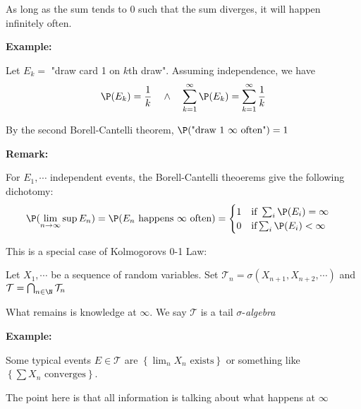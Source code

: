 \par\bigskip
\noindent As long as the sum tends to 0 such that the sum diverges, it will happen infinitely often.
\par\bigskip
\noindent\textbf{Example:}\par
\noindent Let $E_k = $ "draw card 1 on $k$th draw". Assuming independence, we have
\begin{equation*}
  \begin{gathered}
    \P(E_k) = \dfrac{1}{k} \quad\wedge\quad \sum_{k=1}^{\infty}\P(E_k) = \sum_{k=1}^{\infty}\dfrac{1}{k}
  \end{gathered}
\end{equation*}\par
\noindent By the second Borell-Cantelli theorem, $\P(\text{"draw 1 $\infty$ often"}) = 1$
\par\bigskip
\noindent\textbf{Remark:}\par
\noindent For $E_1,\cdots$ independent events, the Borell-Cantelli theoerems give the following dichotomy:
\begin{equation*}
  \begin{gathered}
    \P(\lim_{n\to\infty}\sup E_n) = \P(E_n\text{ happens $\infty$ often}) = \begin{cases}1\quad\text{if } \sum_i \P(E_i) = \infty\\0\quad\text{if}\sum_i\P(E_i)<\infty\end{cases}
  \end{gathered}
\end{equation*}\par
\noindent This is a special case of Kolmogorovs 0-1 Law:
\par\bigskip
\begin{defo}{}
  Let $X_1,\cdots$ be a sequence of random variables. Set $\mathcal{T}_n = \sigma(X_{n+1},X_{n+2},\cdots)$ and $\mathcal{T} = \bigcap_{n\in\N}\mathcal{T}_n$\par
  \noindent What remains is knowledge at $\infty$. We say $\mathcal{T}$ is a tail $\sigma$-\textit{algebra}
\end{defo}
\par\bigskip
\noindent\textbf{Example:}\par
\noindent Some typical events $E\in\mathcal{T}$ are $\left\{\lim_{n}X_n\text{ exists}\right\}$ or something like $\left\{\sum X_n\text{ converges}\right\}$.\par
\noindent The point here is that all information is talking about what happens at $\infty$
\par\bigskip
